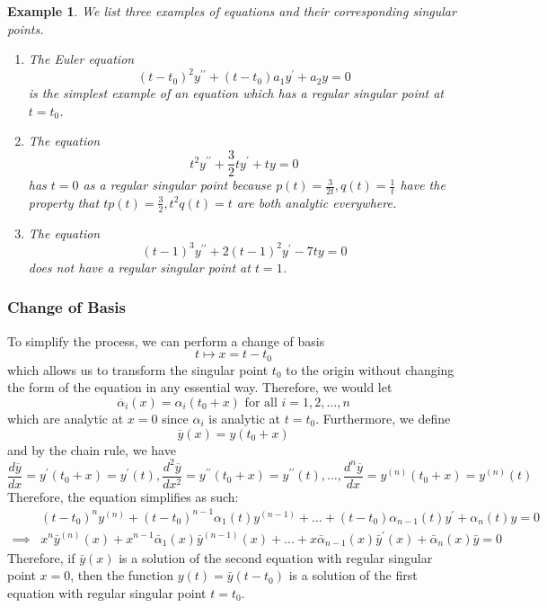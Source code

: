 \documentclass{article}
\newtheorem{example}{Example}[section]
\theoremstyle{remark}
\theoremstyle{definition}
\begin{document}
\begin{example}
We list three examples of equations and their corresponding singular points. 
\begin{enumerate}
    \item The Euler equation 
    \[(t - t_0)^2 y^{\prime\prime} + (t - t_0) a_1 y^\prime + a_2 y = 0\]
    is the simplest example of an equation which has a regular singular point at $t = t_0$. 
    \item The equation 
    \[t^2 y^{\prime\prime} + \frac{3}{2} t y^\prime + ty = 0\]
    has $t = 0$ as a regular singular point because $p(t) = \frac{3}{2t}, q(t) = \frac{1}{t}$ have the property that $t p(t) = \frac{3}{2}, t^2 q(t) = t$ are both analytic everywhere.
    \item The equation 
    \[(t-1)^3 y^{\prime\prime} + 2(t-1)^2 y^\prime - 7ty = 0\]
    does not have a regular singular point at $t = 1$. 
\end{enumerate}
\end{example}

\subsubsection{Change of Basis}
To simplify the process, we can perform a change of basis 
\[t \mapsto x = t - t_0\]
which allows us to transform the singular point $t_0$ to the origin without changing the form of the equation in any essential way. Therefore, we would let 
\[\overline{\alpha}_i (x) = \alpha_i (t_0 + x) \text{ for all } i = 1, 2, \ldots, n\]
which are analytic at $x = 0$ since $\alpha_i$ is analytic at $t = t_0$. Furthermore, we define
\[\overline{y}(x) = y (t_0 + x)\]
and by the chain rule, we have
\[\frac{d \overline{y}}{dx} = y^\prime (t_0 + x) = y^\prime (t), \frac{d^2 \overline{y}}{dx^2} = y^{\prime\prime} (t_0 + x) = y^{\prime\prime} (t), \ldots, \frac{d^n \overline{y}}{dx} = y^{(n)} (t_0 + x) = y^{(n)} (t)\]
Therefore, the equation simplifies as such: 
\begin{align}
    & (t - t_0)^n y^{(n)} + (t - t_0)^{n-1} \alpha_1 (t) y^{(n-1)} + \ldots + (t - t_0) \alpha_{n-1} (t) y^\prime + \alpha_n (t) y = 0 \\
    \implies & x^n \bar{y}^{(n)}(x) + x^{n-1} \bar{\alpha}_1(x) \bar{y}^{(n-1)} (x) + \ldots + x \bar{\alpha}_{n-1} (x) \bar{y}^\prime (x) + \bar{\alpha}_n (x) \bar{y} = 0
\end{align}
Therefore, if $\bar{y}(x)$ is a solution of the second equation with regular singular point $x = 0$, then the function $y(t) = \bar{y} (t - t_0)$ is a solution of the first equation with regular singular point $t = t_0$. 
\end{document}
